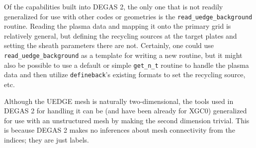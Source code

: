 \documentclass[11pt]{article}
\begin{document}
Of the capabilities built into DEGAS 2, the only one that is not readily generalized for use with other codes or geometries is the \verb+read_uedge_background+ routine.  Reading the plasma data and mapping it onto the primary grid is relatively general, but defining the recycling sources at the target plates and setting the sheath parameters there are not.  Certainly, one could use \verb+read_uedge_background+ as a template for writing a new routine, but it might also be possible to use a default or simple \verb+get_n_t+ routine to handle the plasma data and  then utilize {\tt defineback}'s existing formats to set the recycling source, etc.

Although the UEDGE mesh is naturally two-dimensional, the tools used in DEGAS 2 for handling it can be (and have been already for XGC0) generalized for use with an unstructured mesh by making the second dimension trivial.  This is because DEGAS 2 makes no inferences about mesh connectivity from the indices; they are just labels.
\end{document}
